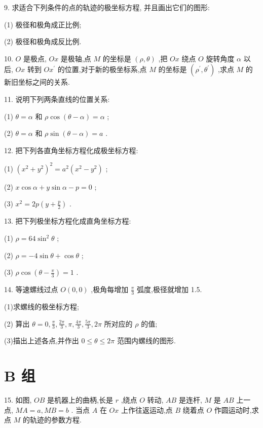 \documentclass[lang=cn,newtx,12pt,scheme=chinese]{elegantbook}
\begin{document}
9. 求适合下列条件的点的轨迹的极坐标方程, 并且画出它们的图形:

(1) 极径和极角成正比例;

(2) 极径和极角成反比例.

10. \(O\) 是极点, \({Ox}\) 是极轴,点 \(M\) 的坐标是 \(\left( {\rho ,\theta }\right)\) ,把 \({Ox}\) 绕点 \(O\) 旋转角度 \(\alpha\) 以后, \({Ox}\) 转到 \(O{x}^{\prime }\) 的位置,对于新的极坐标系,点 \(M\) 的坐标是 \(\left( {{\rho }^{\prime },{\theta }^{\prime }}\right)\) ,求点 \(M\) 的新旧坐标之间的关系.

11. 说明下列两条直线的位置关系:

(1) \(\theta = \alpha\) 和 \(\rho \cos \left( {\theta - \alpha }\right) = \alpha\) ;

(2) \(\theta = \alpha\) 和 \(\rho \sin \left( {\theta - \alpha }\right) = a\) .

12. 把下列各直角坐标方程化成极坐标方程:

(1) \({\left( {x}^{2} + {y}^{2}\right) }^{2} = {a}^{2}\left( {{x}^{2} - {y}^{2}}\right)\) ;

(2) \(x\cos \alpha + y\sin \alpha - p = 0\) ;

(3) \({x}^{2} = {2p}\left( {y + \frac{p}{2}}\right)\) .

13. 把下列极坐标方程化成直角坐标方程:

(1) \(\rho = {64}{\sin }^{2}\theta\) ;

(2) \(\rho = - 4\sin \theta + \cos \theta\) ;

(3) \(\rho \cos \left( {\theta - \frac{\pi }{3}}\right) = 1\) .

14. 等速螺线过点 \(O\left( {0,0}\right)\) ,极角每增加 \(\frac{\pi }{3}\) 弧度,极径就增加 1.5.

(1)求螺线的极坐标方程;

(2) 算出 \(\theta = 0,\frac{\pi }{3},\frac{2\pi }{3},\pi ,\frac{4\pi }{3},\frac{5\pi }{3},{2\pi }\) 所对应的 \(\rho\) 的值;

(3)描出上述各点,并作出 \(0 \leq \theta \leq {2\pi }\) 范围内螺线的图形.

\section*{B 组}

15. 如图, \({OB}\) 是机器上的曲柄,长是 \(r\) ,绕点 \(O\) 转动, \({AB}\) 是连杆, \(M\) 是 \({AB}\) 上一点, \({MA} = a,{MB} = b\) . 当点 \(A\) 在 \({Ox}\) 上作往返运动,点 \(B\) 绕着点 \(O\) 作圆运动时,求点 \(M\) 的轨迹的参数方程.
\end{document}
